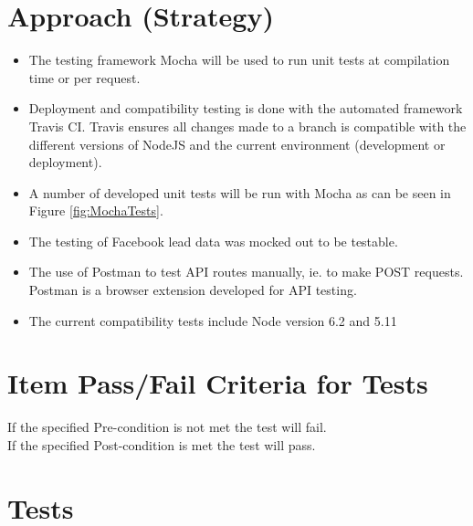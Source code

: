 \documentclass{article}
\begin{document}
\section{Approach (Strategy)}
\begin{itemize}
	\item The testing framework Mocha will be used to run unit tests at compilation time or per request.
	\item Deployment and compatibility testing is done with the automated framework Travis CI. Travis ensures all changes made to a branch is compatible with the different versions of NodeJS and the current environment (development or deployment).
	\item A number of developed unit tests will be run with Mocha as can be seen in Figure \ref{fig:MochaTests}.
	\item The testing of Facebook lead data was mocked out to be testable. 
	\item The use of Postman to test API routes manually, ie. to make POST requests. Postman is a browser extension developed for API testing.
	\item The current compatibility tests include Node version 6.2 and 5.11 
\end{itemize}

\section{Item Pass/Fail Criteria for Tests}
If the specified Pre-condition is not met the test will fail. \\
If the specified Post-condition is met the test will pass.
\cleardoublepage
\section{Tests}
\end{document}
